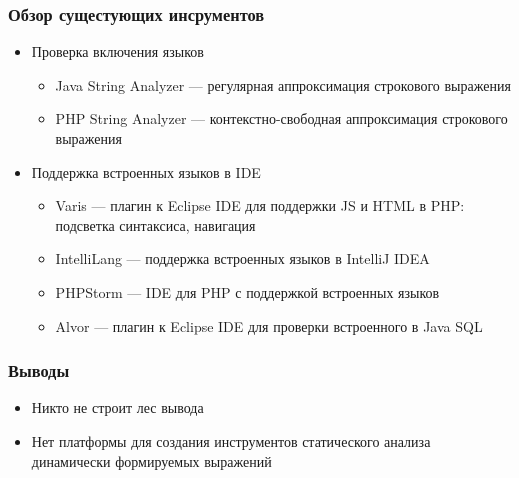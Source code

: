\documentclass{beamer}
\begin{document}
\begin{frame}
    \transwipe[direction=90]
    \frametitle{Обзор сущестующих инсрументов}
    \begin{itemize}
        \item Проверка включения языков 
        \begin{itemize}
            \item Java String Analyzer --- регулярная аппроксимация строкового выражения
            \item PHP String Analyzer --- контекстно-свободная аппроксимация строкового выражения
        \end{itemize}
        \item Поддержка встроенных языков в IDE
        \begin{itemize}
            \item Varis --- плагин к Eclipse IDE для поддержки JS и HTML в PHP: подсветка синтаксиса, навигация
            \item IntelliLang --- поддержка встроенных языков в IntelliJ IDEA
            \item PHPStorm --- IDE для PHP с поддержкой встроенных языков
            \item Alvor --- плагин к Eclipse IDE для проверки встроенного в Java SQL 
        \end{itemize}        
    \end{itemize}
\end{frame}


\begin{frame}
    \transwipe[direction=90]
    \frametitle{Выводы}
    \begin{itemize}
        \item Никто не строит лес вывода
        \item Нет платформы для создания инструментов статического анализа динамически формируемых 
        выражений
    \end{itemize}
\end{frame}
\end{document}
